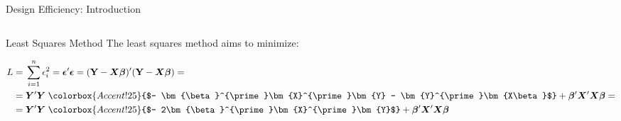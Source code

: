 \documentclass[10pt, compress, aspectratio=169, xcolor={table,usenames,dvipsnames}]{beamer}
\begin{document}
\begin{frame}[label={sec:orgf8f4389}]{Design Efficiency: Introduction}
\begin{columns}
\begin{column}{0.5\columnwidth}
\begin{block}{Least Squares Method}
The \alert{least squares method} aims to minimize:
\vspace{-.7cm}
\begin{center}
\begin{align*}
L =& \; \sum\limits^{n}_{i = 1}{\epsilon_{i}^{2}}
= \bm{\epsilon}^{\prime}\bm{\epsilon}
= (\mathbf{Y} - \bm{X}\bm{\beta})^{\prime}(\mathbf{Y} - \bm{X}\bm{\beta}) = \\
=& \; \bm{Y}^{\prime}\bm{Y}
\; \colorbox{Accent!25}{$- \bm{\beta}^{\prime}\bm{X}^{\prime}\bm{Y} -
\bm{Y}^{\prime}\bm{X\beta}$} +
\bm{\beta}^{\prime}\bm{X}^{\prime}\bm{X\beta} = \\
=& \; \bm{Y}^{\prime}\bm{Y} \;
\colorbox{Accent!25}{$- 2\bm{\beta}^{\prime}\bm{X}^{\prime}\bm{Y}$} +
\bm{\beta}^{\prime}\bm{X}^{\prime}\bm{X\beta}
\end{align*}
\end{center}
\end{block}
\end{column}
\end{columns}
\end{frame}
\end{document}
